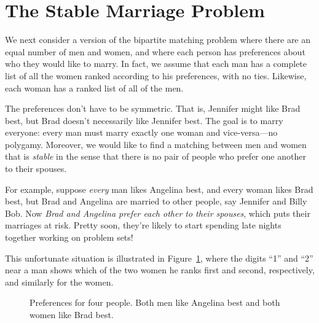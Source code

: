 
\begin{problems}
\classproblems
{}

\examproblems
{}

\homeworkproblems
{}
\end{problems}


\section{The Stable Marriage Problem}
\label{stablemarriagesec}

We next consider a version of the bipartite matching problem where
there are an equal number of men and women, and where each person has
preferences about who they would like to marry.  In fact, we assume
that each man has a complete list of all the women ranked according
to his preferences, with no ties.  Likewise, each woman has a ranked
list of all of the men.

The preferences don't have to be symmetric.  That is, Jennifer might
like Brad best, but Brad doesn't necessarily like Jennifer best.  The
goal is to marry everyone: every man must marry exactly one woman and
vice-versa---no polygamy.  Moreover, we would like to find a matching
between men and women that is \emph{stable} in the sense that there is
no pair of people who prefer one another to their spouses.

For example, suppose \emph{every} man likes Angelina best, and every
woman likes Brad best, but Brad and Angelina are married to other
people, say Jennifer and Billy Bob.  Now \emph{Brad and Angelina
  prefer each other to their spouses}, which puts their marriages at
risk.  Pretty soon, they're likely to start spending late nights
together working on problem sets!

This unfortunate situation is illustrated in
Figure~\ref{fig:minWtMatch2}, where the digits ``1'' and ``2'' near a
man shows which of the two women he ranks first and second,
respectively, and similarly for the women.

\begin{figure}


\caption{Preferences for four people.  Both men like Angelina best and
both women like Brad best.}
\label{fig:minWtMatch2}
\end{figure}

